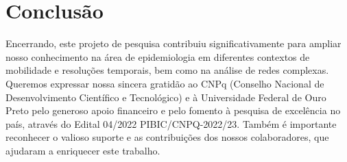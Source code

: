 \chapter[Conclusão]{Conclusão}

Encerrando, este projeto de pesquisa contribuiu significativamente para ampliar nosso conhecimento na área de epidemiologia em diferentes contextos de mobilidade e resoluções temporais, bem como na análise de redes complexas. Queremos expressar nossa sincera gratidão ao CNPq (Conselho Nacional de Desenvolvimento Científico e Tecnológico) e à Universidade Federal de Ouro Preto pelo generoso apoio financeiro e pelo fomento à pesquisa de excelência no país, através do Edital 04/2022 PIBIC/CNPQ-2022/23. Também é importante reconhecer o valioso suporte e as contribuições dos nossos colaboradores, que ajudaram a enriquecer este trabalho.